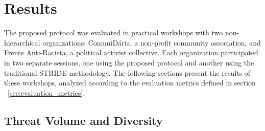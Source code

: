 \section{Results}
\label{sec:results}

The proposed protocol was evaluated in practical workshops with two non-hierarchical
organizations: ComuniDária, a non-profit community association, and Frente Anti-Racista,
a political activist collective. Each organization participated in two separate sessions,
one using the proposed protocol and another using the traditional STRIDE methodology.
The following sections present the results of these workshops, analyzed according to the
evaluation metrics defined in section ~\ref{sec:evaluation_metrics}.

\subsection{Threat Volume and Diversity}
\label{subsec:threat_volumediversity}

\begin{table}[]
    \caption{Quantitative Comparison of Threat Modeling Methodologies}
    \label{tab:evaluation-results}
    \scriptsize
\end{table}

